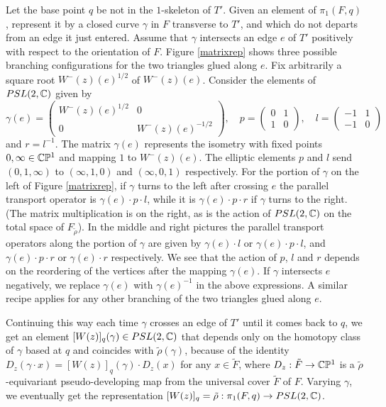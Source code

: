 Let the base point $q$ be not in the $1$-skeleton of $T'$.  Given
an element of $\pi_1(F,q)$, represent it by a closed curve
$\gamma$ in $F$ transverse to $T'$, and which do not departs from
an edge it just entered. Assume that $\gamma$ intersects an edge
$e$ of $T'$ positively with respect to the orientation of $F$.
Figure \ref{matrixrep} shows three possible branching
configurations for the two triangles glued along $e$. Fix
arbitrarily a square root $W^-(z)(e)^{1/2}$ of $W^-(z)(e)$.
Consider the elements of $PSL(2,\mathbb{C})$ given by $$\gamma(e)=\left(
\begin{array}{cc} W^-(z)(e)^{1/2} & 0 \\ 0 & W^-(z)(e)^{-1/2}
  \end{array} \right), \quad p=\left(
  \begin{array}{cc} 0 & 1 \\ 1 & 0  \end{array}\right),
\quad l=\left(\begin{array}{cc} -1 & 1 \\ -1 & 0
\end{array}\right)$$
and $r=l^{-1}$. The matrix $\gamma(e)$ represents the isometry
with fixed points $0,\infty \in \mathbb{C}\mathbb{P}^1$ and mapping $1$
to $W^-(z)(e)$.  The elliptic elements $p$ and $l$ send
$(0,1,\infty)$ to $(\infty,1,0)$ and $(\infty, 0,1)$ respectively.
For the portion of $\gamma$ on the left of Figure \ref{matrixrep},
if $\gamma$ turns to the left after crossing $e$ the parallel
transport operator is $\gamma(e)\cdot p\cdot l$, while it is
$\gamma(e)\cdot p\cdot r$ if $\gamma$ turns to the right.  (The
matrix multiplication is on the right, as is the action of
$PSL(2,\mathbb{C})$ on the total space of $F_{\tilde{\rho}}$). In the
middle and right pictures the parallel transport operators along
the portion of $\gamma$ are given by $\gamma(e)\cdot l$ or
$\gamma(e)\cdot p\cdot l$, and $\gamma(e)\cdot p\cdot r$ or
$\gamma(e)\cdot r$ respectively. We see that the action of $p$,
$l$ and $r$ depends on the reordering of the vertices after the
mapping $\gamma(e)$. If $\gamma$ intersects $e$ negatively, we
replace $\gamma(e)$ with $\gamma(e)^{-1}$ in the above
expressions. A similar recipe applies for any other branching of
the two triangles glued along $e$.

Continuing this way each time $\gamma$ crosses an edge of $T'$
until it comes back to $q$, we get an element $[W(z)]_q(\gamma)
\in PSL(2,\mathbb{C})$ that depends only on the homotopy class of
$\gamma$ based at $q$ and coincides with $\tilde{\rho}(\gamma)$,
because of the identity $D_z(\gamma \cdot x) = [W(z)]_q(\gamma)
\cdot D_z(x)$ for any $x \in \tilde{F}$, where $D_z: \tilde{F}
\rightarrow \mathbb{C}\mathbb{P}^1$ is a $\tilde{\rho}$-equivariant
pseudo-developing map from the universal cover $\tilde{F}$ of $F$.
Varying $\gamma$, we eventually get the representation $[W(z)]_q
=\tilde{\rho}: \pi_1(F,q) \rightarrow PSL(2,\mathbb{C})$.
\smallskip

